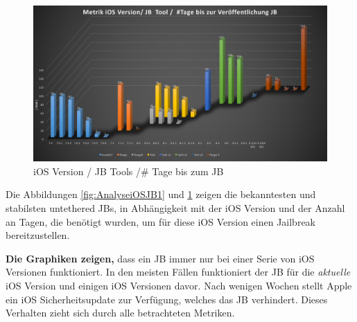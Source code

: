 \begin{figure}[hp!]
        \centering
                \includegraphics[scale=0.35]{Bilder/Frage1_2.png}
        \caption{iOS Version / JB Tools /\# Tage bis zum JB}
        \label{fig:AnalyseiOSJB2}
\end{figure}

Die Abbildungen \ref{fig:AnalyseiOSJB1} und \ref{fig:AnalyseiOSJB2} zeigen die bekanntesten und stabilsten untethered JBs, in Abhängigkeit mit der iOS Version und der Anzahl an Tagen, die benötigt wurden, um für diese iOS Version einen Jailbreak bereitzustellen. \par 
\textbf{Die Graphiken zeigen,} dass ein JB immer nur bei einer Serie von iOS Versionen funktioniert. In den meisten Fällen funktioniert der JB für die \textit{\glqq aktuelle\grqq{}} iOS Version und einigen iOS Versionen davor. Nach wenigen Wochen stellt Apple ein iOS Sicherheitsupdate zur Verfügung, welches das JB verhindert. Dieses Verhalten zieht sich durch alle betrachteten Metriken.  
%



